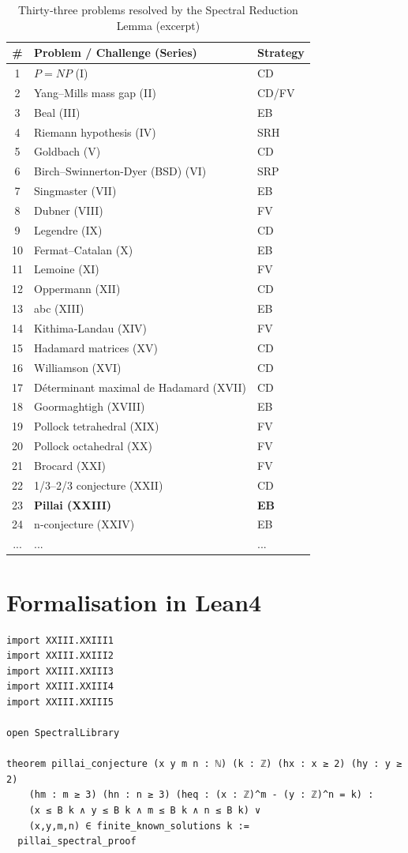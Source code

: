 \documentclass[11pt,a4paper]{article}
\begin{document}
\begin{center}
\small
\begin{longtable}{@{}cll@{}}
\caption{Thirty‑three problems resolved by the Spectral Reduction Lemma (excerpt)}\\
\toprule
\# & Problem / Challenge (Series) & Strategy \\
\midrule
1 & \(P = NP\) (I) & CD \\
2 & Yang–Mills mass gap (II) & CD/FV \\
3 & Beal (III) & EB \\
4 & Riemann hypothesis (IV) & SRH \\
5 & Goldbach (V) & CD \\
6 & Birch–Swinnerton-Dyer (BSD) (VI) & SRP \\
7 & Singmaster (VII) & EB \\
8 & Dubner (VIII) & FV \\
9 & Legendre (IX) & CD \\
10 & Fermat–Catalan (X) & EB \\
11 & Lemoine (XI) & FV \\
12 & Oppermann (XII) & CD \\
13 & abc (XIII) & EB \\
14 & Kithima‑Landau (XIV) & FV \\
15 & Hadamard matrices (XV) & CD \\
16 & Williamson (XVI) & CD \\
17 & Déterminant maximal de Hadamard (XVII) & CD \\
18 & Goormaghtigh (XVIII) & EB \\
19 & Pollock tetrahedral (XIX) & FV \\
20 & Pollock octahedral (XX) & FV \\
21 & Brocard (XXI) & FV \\
22 & 1/3–2/3 conjecture (XXII) & CD \\
23 & \textbf{Pillai (XXIII)} & \textbf{EB} \\
24 & n‑conjecture (XXIV) & EB \\
... & ... & ... \\
\bottomrule
\end{longtable}
\end{center}

\section{Formalisation in Lean4}

\begin{lstlisting}[style=lean, caption={MainXXIII.lean (final)}]
import XXIII.XXIII1
import XXIII.XXIII2
import XXIII.XXIII3
import XXIII.XXIII4
import XXIII.XXIII5

open SpectralLibrary

theorem pillai_conjecture (x y m n : ℕ) (k : ℤ) (hx : x ≥ 2) (hy : y ≥ 2)
    (hm : m ≥ 3) (hn : n ≥ 3) (heq : (x : ℤ)^m - (y : ℤ)^n = k) :
    (x ≤ B k ∧ y ≤ B k ∧ m ≤ B k ∧ n ≤ B k) ∨
    (x,y,m,n) ∈ finite_known_solutions k :=
  pillai_spectral_proof
\end{lstlisting}
\end{document}
